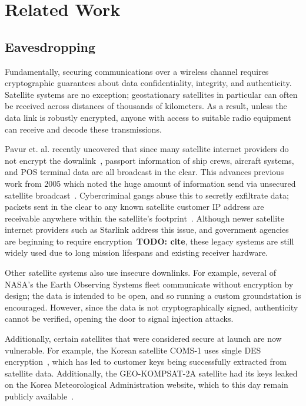 \section{Related Work}

\subsection{Eavesdropping}


Fundamentally, securing communications over a wireless channel requires cryptographic guarantees about data confidentiality, integrity, and authenticity.
Satellite systems are no exception; geostationary satellites in particular can often be received across distances of thousands of kilometers.
As a result, unless the data link is robustly encrypted, anyone with access to suitable radio equipment can receive and decode these transmissions.

Pavur et. al. recently uncovered that since many satellite internet providers do not encrypt the downlink~\cite{pavur2020tale}, passport information of ship crews, aircraft systems, and POS terminal data are all broadcast in the clear.
This advances previous work from 2005 which noted the huge amount of information send via unsecured satellite broadcast~\cite{adelsbach2005satellite}.
Cybercriminal gangs abuse this to secretly exfiltrate data; packets sent in the clear to any known satellite customer IP address are receivable anywhere within the satellite's footprint~\cite{satellite_apt}.
Although newer satellite internet providers such as Starlink address this issue, and government agencies are beginning to require encryption~\textbf{TODO: cite}, these legacy systems are still widely used due to long mission lifespans and existing receiver hardware.

Other satellite systems also use insecure downlinks.
For example, several of NASA's the Earth Observing Systems fleet communicate without encryption by design; the data is intended to be open, and so running a custom groundstation is encouraged.
However, since the data is not cryptographically signed, authenticity cannot be verified, opening the door to signal injection attacks.

Additionally, certain satellites that were considered secure at launch are now vulnerable.
For example, the Korean satellite COMS-1 uses single DES encryption~\cite{lrit-key-dec}, which has led to customer keys being successfully extracted from satellite data.
Additionally, the GEO-KOMPSAT-2A satellite had its keys leaked on the Korea Meteorological Administration website, which to this day remain publicly available~\cite{xrit-rx}.

